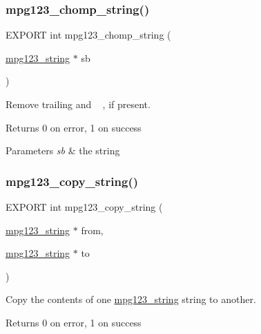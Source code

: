 \subsubsection{\texorpdfstring{mpg123\+\_\+chomp\+\_\+string()}{mpg123\_chomp\_string()}}
{\footnotesize\ttfamily E\+X\+P\+O\+RT int mpg123\+\_\+chomp\+\_\+string (\begin{DoxyParamCaption}\item[{\hyperlink{structmpg123__string}{mpg123\+\_\+string} $\ast$}]{sb }\end{DoxyParamCaption})}

Remove trailing  and ~\newline
, if present. \begin{DoxyReturn}{Returns}
0 on error, 1 on success 
\end{DoxyReturn}

\begin{DoxyParams}{Parameters}
{\em sb} & the string \\
\hline
\end{DoxyParams}
\mbox{\label{group__mpg123__metadata_ga6f046f76f7ef3961cf6cb17c8d2a5a94}} 
\subsubsection{\texorpdfstring{mpg123\+\_\+copy\+\_\+string()}{mpg123\_copy\_string()}}
{\footnotesize\ttfamily E\+X\+P\+O\+RT int mpg123\+\_\+copy\+\_\+string (\begin{DoxyParamCaption}\item[{\hyperlink{structmpg123__string}{mpg123\+\_\+string} $\ast$}]{from,  }\item[{\hyperlink{structmpg123__string}{mpg123\+\_\+string} $\ast$}]{to }\end{DoxyParamCaption})}

Copy the contents of one \hyperlink{structmpg123__string}{mpg123\+\_\+string} string to another. \begin{DoxyReturn}{Returns}
0 on error, 1 on success 
\end{DoxyReturn}
\mbox{\label{group__mpg123__metadata_gaa7f088a7bcb3063b005e45d8c0e428ed}} 
